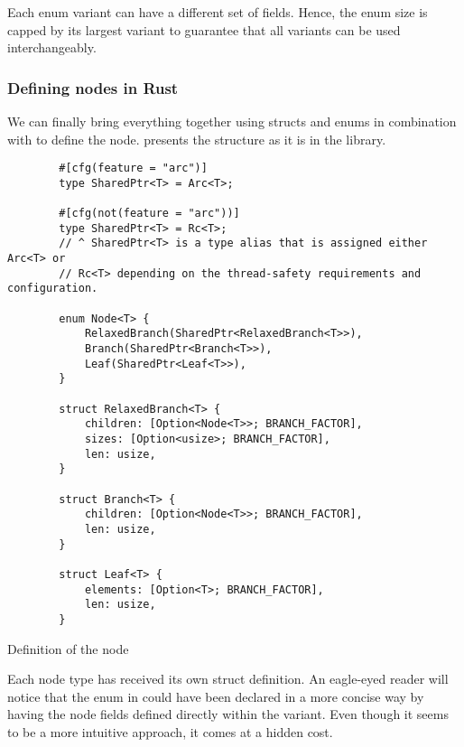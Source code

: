 Each enum variant can have a different set of fields. Hence, the enum size is capped by its largest variant to guarantee that all variants can be used interchangeably.

\subsubsection*{Defining \rrbtree{} nodes in Rust}

We can finally bring everything together using structs and enums in combination with \rc{} to define the \rrbtree{} node.  presents the structure as it is in the library.

\begin{listing}[!ht]

    \centering
    \begin{verbatim}
        #[cfg(feature = "arc")]
        type SharedPtr<T> = Arc<T>;

        #[cfg(not(feature = "arc"))]
        type SharedPtr<T> = Rc<T>;
        // ^ SharedPtr<T> is a type alias that is assigned either Arc<T> or
        // Rc<T> depending on the thread-safety requirements and configuration.

        enum Node<T> {
            RelaxedBranch(SharedPtr<RelaxedBranch<T>>),
            Branch(SharedPtr<Branch<T>>),
            Leaf(SharedPtr<Leaf<T>>),
        }

        struct RelaxedBranch<T> {
            children: [Option<Node<T>>; BRANCH_FACTOR],
            sizes: [Option<usize>; BRANCH_FACTOR],
            len: usize,
        }

        struct Branch<T> {
            children: [Option<Node<T>>; BRANCH_FACTOR],
            len: usize,
        }

        struct Leaf<T> {
            elements: [Option<T>; BRANCH_FACTOR],
            len: usize,
        }
    \end{verbatim}

    \caption{Definition of the \rrbtree{} node}
    \label{fig:rrbtree-node}
\end{listing}

Each node type has received its own struct definition. An eagle-eyed reader will notice that the  enum in  could have been declared in a more concise way by having the node fields defined directly within the variant. Even though it seems to be a more intuitive approach, it comes at a hidden cost.


